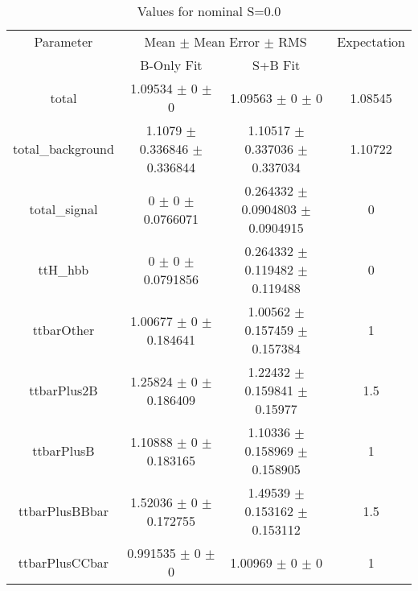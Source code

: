 \begin{table}
\centering
\caption{Values for nominal S=0.0}
\begin{tabular}{cccc}
\toprule
Parameter & \multicolumn{2}{c}{Mean $\pm$ Mean Error $\pm$ RMS} & Expectation\\
 & B-Only Fit & S+B Fit & \\
\midrule
total & \num{1.09534} $\pm$ \num{0} $\pm$ \num{0} & \num{1.09563} $\pm$ \num{0} $\pm$ \num{0} & \num{1.08545}\\
total\_background & \num{1.1079} $\pm$ \num{0.336846} $\pm$ \num{0.336844} & \num{1.10517} $\pm$ \num{0.337036} $\pm$ \num{0.337034} & \num{1.10722}\\
total\_signal & \num{0} $\pm$ \num{0} $\pm$ \num{0.0766071} & \num{0.264332} $\pm$ \num{0.0904803} $\pm$ \num{0.0904915} & \num{0}\\
ttH\_hbb & \num{0} $\pm$ \num{0} $\pm$ \num{0.0791856} & \num{0.264332} $\pm$ \num{0.119482} $\pm$ \num{0.119488} & \num{0}\\
ttbarOther & \num{1.00677} $\pm$ \num{0} $\pm$ \num{0.184641} & \num{1.00562} $\pm$ \num{0.157459} $\pm$ \num{0.157384} & \num{1}\\
ttbarPlus2B & \num{1.25824} $\pm$ \num{0} $\pm$ \num{0.186409} & \num{1.22432} $\pm$ \num{0.159841} $\pm$ \num{0.15977} & \num{1.5}\\
ttbarPlusB & \num{1.10888} $\pm$ \num{0} $\pm$ \num{0.183165} & \num{1.10336} $\pm$ \num{0.158969} $\pm$ \num{0.158905} & \num{1}\\
ttbarPlusBBbar & \num{1.52036} $\pm$ \num{0} $\pm$ \num{0.172755} & \num{1.49539} $\pm$ \num{0.153162} $\pm$ \num{0.153112} & \num{1.5}\\
ttbarPlusCCbar & \num{0.991535} $\pm$ \num{0} $\pm$ \num{0} & \num{1.00969} $\pm$ \num{0} $\pm$ \num{0} & \num{1}\\
\bottomrule
\end{tabular}
\end{table}